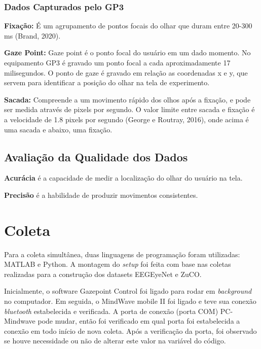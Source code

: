 \subsubsection{Dados Capturados pelo GP3}

\textbf{Fixação:} É um agrupamento de pontos focais do olhar que duram entre 20-300 ms (Brand, 2020).

\textbf{Gaze Point:} Gaze point é o ponto focal do usuário em um dado momento. No equipamento GP3 é gravado um ponto focal a cada aproximadamente 17 milisegundos.
O ponto de gaze é gravado em relação as coordenadas x e y, que servem para identificar a posição do olhar na tela de experimento. 

\textbf{Sacada:} Compreende a um movimento rápido dos olhos após a fixação, e pode ser medida através de pixels por segundo.
O valor limite entre sacada e fixação é a velocidade de 1.8 pixels por segundo (George e Routray, 2016), onde acima
é uma sacada e abaixo, uma fixação.



\subsection{Avaliação da Qualidade dos Dados}

\textbf{Acurácia} é a capacidade de medir a localização do olhar do usuário na tela. 

\textbf{Precisão} é a habilidade de produzir movimentos consistentes. 

\section{Coleta}
Para a coleta simultânea, duas linguagens de programação foram utilizadas: MATLAB e Python. 
A montagem do \textit{setup} foi feita com base nas coletas realizadas para a construção dos datasets EEGEyeNet e 
 ZuCO. 

Inicialmente, o software Gazepoint Control foi ligado para rodar em \textit{background} no computador. 
Em seguida, o MindWave mobile II foi ligado e teve sua conexão \textit{bluetooth} estabelecida e verificada.
A porta de conexão (porta COM) PC-Mindwave pode mudar, então foi verificado em qual porta foi estabelecida a conexão 
em todo início de nova coleta. Após a verificação da porta, foi observado se houve necessidade ou não de alterar
este valor na variável do código. 
    
